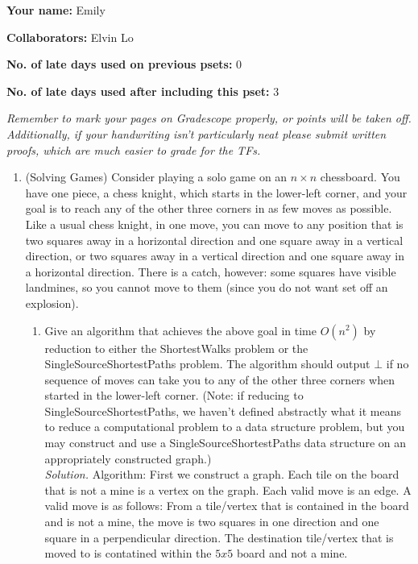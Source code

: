 \documentclass[11pt]{article}
\begin{document}

\textbf{Your name: } Emily

\textbf{Collaborators: } Elvin Lo

\textbf{No. of late days used on previous psets: } 0

\textbf{No. of late days used after including this pset: } 3

\medskip \noindent
\textit{Remember to mark your pages on Gradescope properly, or points will be taken off. Additionally, if your handwriting isn't particularly neat please submit written proofs, which are much easier to grade for the TFs.}

\begin{enumerate}
    \item (Solving Games) Consider playing a solo game on an $n\times n$ chessboard.  You have one piece, a chess knight, which starts in the lower-left corner, and your goal is to reach any of the other three corners in as few moves as possible.  Like a usual chess knight, in one move, you can move to any position that is two squares away in a horizontal direction and one square away in a vertical direction, or two squares away in a vertical direction and one square away in a horizontal direction.  There is a catch, however: some squares have visible landmines, so you cannot move to them (since you do not want set off an explosion). 

    \begin{enumerate}
    \item Give an algorithm that achieves the above goal in time $O(n^2)$ by reduction to either the ShortestWalks problem or the SingleSourceShortestPaths problem. The algorithm should output $\bot$ if no sequence of moves can take you to any of the other three corners when started in the lower-left corner. (Note: if reducing to SingleSourceShortestPaths, we haven't defined abstractly what it means to reduce a computational problem to a data structure problem, but you may construct and use a SingleSourceShortestPaths data structure on an appropriately constructed graph.) \\
    
    \textit{Solution. }
      Algorithm: First we construct a graph. Each tile on the board that is not a mine is a vertex on the graph. Each valid move is an edge. A valid move is as follows: From a tile/vertex that is contained in the board and is not a mine, the move is two squares in one direction and one square in a perpendicular direction. The destination tile/vertex that is moved to is contatined within the $5x5$ board and not a mine.\\
      

\end{enumerate}
\end{enumerate}
\end{document}
